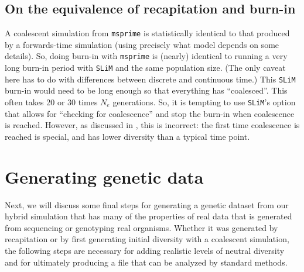 \documentclass[12pt]{article}
\newcommand{\msprime}[0]{\texttt{msprime}\xspace}
\newcommand{\slim}[0]{\texttt{SLiM}\xspace}
\begin{document}
\subsection{On the equivalence of recapitation and burn-in}

A coalescent simulation from \msprime
is statistically identical to that produced by a forwards-time simulation
(using precisely what model depends on some details).
So, doing burn-in with \msprime is (nearly) identical to running a very long burn-in period
with \slim and the same population size.
(The only caveat here has to do with differences between discrete and continuous time.)
This \slim burn-in would need to be long enough so that everything has ``coalesced''.
This often takes 20 or 30 times $N_e$ generations.
So, it is tempting to use \slim's option that allows for ``checking for coalescence''
and stop the burn-in when coalescence is reached.
However, as discussed in \citet{haller_tree-sequence_2019}, 
this is incorrect: the first time coalescence is reached is special, and has lower diversity than a typical time point.


\section{Generating genetic data}

Next, we will discuss some final steps for generating a genetic dataset from our hybrid simulation that has many of the properties of real data that is generated from
sequencing or genotyping real organisms. Whether it was generated by recapitation or by first generating initial
diversity with a coalescent simulation, the following steps are necessary for adding realistic levels of neutral diversity and for ultimately producing a
file that can be analyzed by standard methods.
\end{document}
